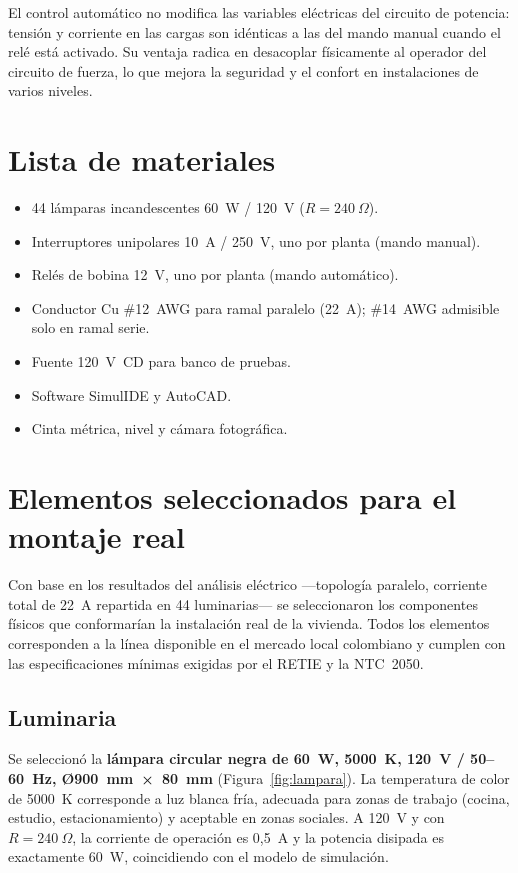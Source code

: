 El control automático no modifica las variables eléctricas del circuito de potencia: tensión y corriente en las cargas son idénticas a las del mando manual cuando el relé está activado. Su ventaja radica en desacoplar físicamente al operador del circuito de fuerza, lo que mejora la seguridad y el confort en instalaciones de varios niveles.

\section{Lista de materiales}

\begin{itemize}
  \item 44 lámparas incandescentes 60~W / 120~V ($R = 240~\Omega$).
  \item Interruptores unipolares 10~A / 250~V, uno por planta (mando manual).
  \item Relés de bobina 12~V, uno por planta (mando automático).
  \item Conductor Cu \#12~AWG para ramal paralelo (22~A); \#14~AWG admisible solo en ramal serie.
  \item Fuente 120~V~CD para banco de pruebas.
  \item Software SimulIDE y AutoCAD.
  \item Cinta métrica, nivel y cámara fotográfica.
\end{itemize}

\section{Elementos seleccionados para el montaje real}

Con base en los resultados del análisis eléctrico —topología paralelo, corriente total de 22~A repartida en 44 luminarias— se seleccionaron los componentes físicos que conformarían la instalación real de la vivienda. Todos los elementos corresponden a la línea disponible en el mercado local colombiano y cumplen con las especificaciones mínimas exigidas por el RETIE y la NTC~2050.

\subsection{Luminaria}

Se seleccionó la \textbf{lámpara circular negra de 60~W, 5000~K, 120~V / 50--60~Hz, Ø900~mm~×~80~mm} (Figura~\ref{fig:lampara}). La temperatura de color de 5000~K corresponde a luz blanca fría, adecuada para zonas de trabajo (cocina, estudio, estacionamiento) y aceptable en zonas sociales. A 120~V y con $R = 240~\Omega$, la corriente de operación es 0{,}5~A y la potencia disipada es exactamente 60~W, coincidiendo con el modelo de simulación.

